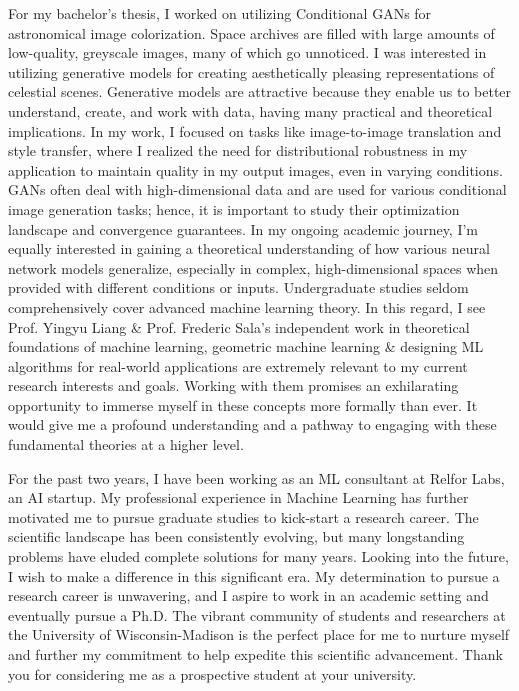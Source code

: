 \documentclass{article}
\begin{document}
\hspace{0.25in}For my bachelor’s thesis, I worked on utilizing Conditional GANs
for astronomical image colorization. Space archives are filled with large
amounts of low-quality, greyscale images, many of which go unnoticed. I was
interested in utilizing generative models for creating aesthetically pleasing
representations of celestial scenes. Generative models are attractive because
they enable us to better understand, create, and work with data, having many
practical and theoretical implications. In my work, I focused on tasks like
image-to-image translation and style transfer, where I realized the need for
distributional robustness in my application to maintain quality in my output
images, even in varying conditions. GANs often deal with high-dimensional data
and are used for various conditional image generation tasks; hence, it is
important to study their optimization landscape and convergence guarantees. In
my ongoing academic journey, I’m equally interested in gaining a theoretical
understanding of how various neural network models generalize, especially in
complex, high-dimensional spaces when provided with different conditions or
inputs. Undergraduate studies seldom comprehensively cover advanced machine
learning theory. In this regard, I see Prof. Yingyu Liang \& Prof. Frederic
Sala’s independent work in theoretical foundations of machine learning,
geometric machine learning \& designing ML algorithms for real-world applications
are extremely relevant to my current research interests and goals. Working with
them promises an exhilarating opportunity to immerse myself in these concepts
more formally than ever. It would give me a profound understanding and a pathway
to engaging with these fundamental theories at a higher level.
\vspace{2pt}

\hspace{0.25in}For the past two years, I have been working as an ML consultant
at Relfor Labs, an AI startup. My professional experience in Machine Learning
has further motivated me to pursue graduate studies to kick-start a research
career. The scientific landscape has been consistently evolving, but many
longstanding problems have eluded complete solutions for many years. Looking
into the future, I wish to make a difference in this significant era. My
determination to pursue a research career is unwavering, and I aspire to work in
an academic setting and eventually pursue a Ph.D. The vibrant community of
students and researchers at the University of Wisconsin-Madison is the perfect
place for me to nurture myself and further my commitment to help expedite this
scientific advancement. Thank you for considering me as a prospective student at
your university.
\end{document}
